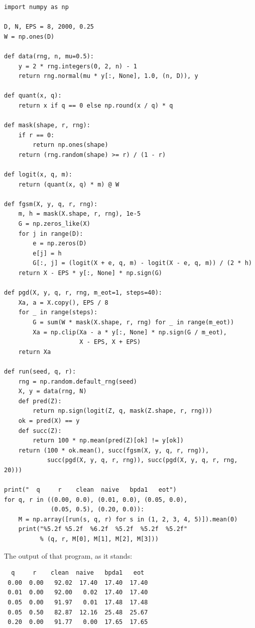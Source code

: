 \begin{lab}
\begin{verbatim}
import numpy as np

D, N, EPS = 8, 2000, 0.25
W = np.ones(D)

def data(rng, n, mu=0.5):
    y = 2 * rng.integers(0, 2, n) - 1
    return rng.normal(mu * y[:, None], 1.0, (n, D)), y

def quant(x, q):
    return x if q == 0 else np.round(x / q) * q

def mask(shape, r, rng):
    if r == 0:
        return np.ones(shape)
    return (rng.random(shape) >= r) / (1 - r)

def logit(x, q, m):
    return (quant(x, q) * m) @ W

def fgsm(X, y, q, r, rng):
    m, h = mask(X.shape, r, rng), 1e-5
    G = np.zeros_like(X)
    for j in range(D):
        e = np.zeros(D)
        e[j] = h
        G[:, j] = (logit(X + e, q, m) - logit(X - e, q, m)) / (2 * h)
    return X - EPS * y[:, None] * np.sign(G)

def pgd(X, y, q, r, rng, m_eot=1, steps=40):
    Xa, a = X.copy(), EPS / 8
    for _ in range(steps):
        G = sum(W * mask(X.shape, r, rng) for _ in range(m_eot))
        Xa = np.clip(Xa - a * y[:, None] * np.sign(G / m_eot),
                     X - EPS, X + EPS)
    return Xa

def run(seed, q, r):
    rng = np.random.default_rng(seed)
    X, y = data(rng, N)
    def pred(Z):
        return np.sign(logit(Z, q, mask(Z.shape, r, rng)))
    ok = pred(X) == y
    def succ(Z):
        return 100 * np.mean(pred(Z)[ok] != y[ok])
    return (100 * ok.mean(), succ(fgsm(X, y, q, r, rng)),
            succ(pgd(X, y, q, r, rng)), succ(pgd(X, y, q, r, rng, 20)))

print("  q     r    clean  naive   bpda1   eot")
for q, r in ((0.00, 0.0), (0.01, 0.0), (0.05, 0.0),
             (0.05, 0.5), (0.20, 0.0)):
    M = np.array([run(s, q, r) for s in (1, 2, 3, 4, 5)]).mean(0)
    print("%5.2f %5.2f  %6.2f  %5.2f  %5.2f  %5.2f"
          % (q, r, M[0], M[1], M[2], M[3]))
\end{verbatim}

The output of that program, as it stands:

\begin{verbatim}
  q     r    clean  naive   bpda1   eot
 0.00  0.00   92.02  17.40  17.40  17.40
 0.01  0.00   92.00   0.02  17.40  17.40
 0.05  0.00   91.97   0.01  17.48  17.48
 0.05  0.50   82.87  12.16  25.48  25.67
 0.20  0.00   91.77   0.00  17.65  17.65
\end{verbatim}
\end{lab}

